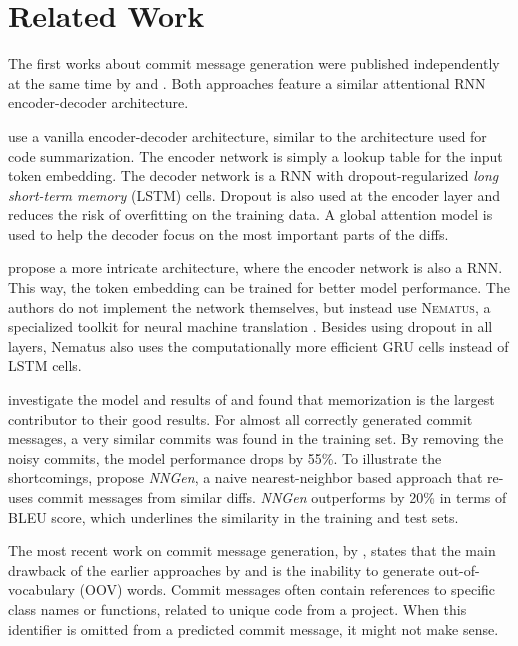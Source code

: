 \section{Related Work}\label{sec:relatedwork}

The first works about commit message generation were published independently at the same time by \citet{loyola_neural_2017} and \citet{jiang_automatically_2017}. Both approaches feature a similar attentional RNN encoder-decoder architecture.

\citet{loyola_neural_2017} use a vanilla encoder-decoder architecture, similar to the architecture \citet{iyer_summarizing_2016} used for code summarization. The encoder network is simply a lookup table for the input token embedding. The decoder network is a RNN with dropout-regularized \textit{long short-term memory} (LSTM) cells. Dropout is also used at the encoder layer and reduces the risk of overfitting on the training data. A global attention model is used to help the decoder focus on the most important parts of the diffs.

\citet{jiang_automatically_2017} propose a more intricate architecture, where the encoder network is also a RNN. This way, the token embedding can be trained for better model performance. The authors do not implement the network themselves, but instead use \textsc{Nematus}, a specialized toolkit for neural machine translation \cite{sennrich_nematus:_2017}. Besides using dropout in all layers, Nematus also uses the computationally more efficient GRU cells instead of LSTM cells.

\citet{liu_neural-machine-translation-based_2018} investigate the model and results of \cite{jiang_automatically_2017} and found that memorization is the largest contributor to their good results. For almost all correctly generated commit messages, a very similar commits was found in the training set. By removing the noisy commits, the model performance drops by 55\%. To illustrate the shortcomings, \citet{liu_neural-machine-translation-based_2018} propose \textit{NNGen}, a naive nearest-neighbor based approach that re-uses commit messages from similar diffs. \textit{NNGen} outperforms \cite{jiang_automatically_2017} by 20\% in terms of BLEU score, which underlines the similarity in the training and test sets.

The most recent work on commit message generation, by \citet{liu_generating_2019}, states that the main drawback of the earlier approaches by \citet{loyola_neural_2017} and \citet{jiang_automatically_2017} is the inability to generate out-of-vocabulary (OOV) words. Commit messages often contain references to specific class names or functions, related to unique code from a project. When this identifier is omitted from a predicted commit message, it might not make sense.

